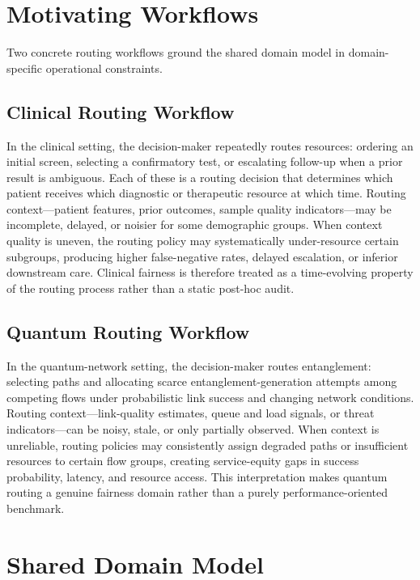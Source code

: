 \documentclass{IEEEtran}
\begin{document}
\section{Motivating Workflows}

Two concrete routing workflows ground the shared domain model in
domain-specific operational constraints.

\subsection{Clinical Routing Workflow}
In the clinical setting, the decision-maker repeatedly routes resources:
ordering an initial screen, selecting a confirmatory test, or escalating
follow-up when a prior result is ambiguous. Each of these is a routing
decision that determines which patient receives which diagnostic or
therapeutic resource at which time. Routing context---patient features,
prior outcomes, sample quality indicators---may be incomplete, delayed, or
noisier for some demographic groups. When context quality is uneven, the
routing policy may systematically under-resource certain subgroups,
producing higher false-negative rates, delayed escalation, or inferior
downstream care. Clinical fairness is therefore treated as a time-evolving
property of the routing process rather than a static post-hoc audit.

\subsection{Quantum Routing Workflow}
In the quantum-network setting, the decision-maker routes entanglement:
selecting paths and allocating scarce entanglement-generation attempts among
competing flows under probabilistic link success and changing network
conditions. Routing context---link-quality estimates, queue and load signals,
or threat indicators---can be noisy, stale, or only partially observed. When
context is unreliable, routing policies may consistently assign degraded
paths or insufficient resources to certain flow groups, creating
service-equity gaps in success probability, latency, and resource access.
This interpretation makes quantum routing a genuine fairness domain rather
than a purely performance-oriented benchmark.

\section{Shared Domain Model}
\end{document}
